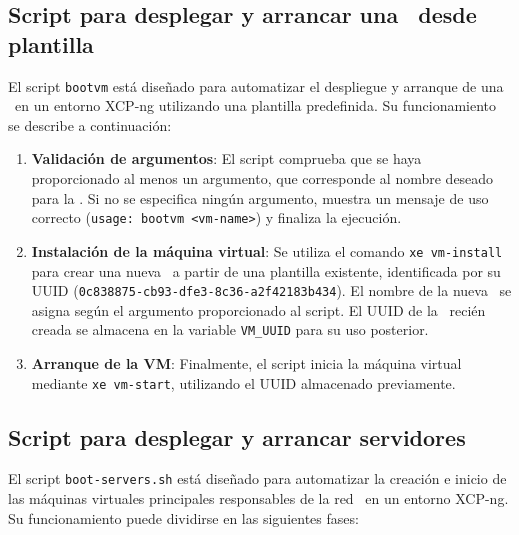 

\subsection{Script para desplegar y arrancar una \VM\ desde plantilla}
\noindent
El script \texttt{bootvm} está diseñado para automatizar el despliegue y arranque de una \VM\ en un entorno XCP-ng utilizando una plantilla predefinida. Su funcionamiento se describe a continuación:

\begin{enumerate}
    \item \textbf{Validación de argumentos}:  
    El script comprueba que se haya proporcionado al menos un argumento, que corresponde al nombre deseado para la \VM. Si no se especifica ningún argumento, muestra un mensaje de uso correcto (\texttt{usage: bootvm <vm-name>}) y finaliza la ejecución.

    \item \textbf{Instalación de la máquina virtual}:  
    Se utiliza el comando \texttt{xe vm-install} para crear una nueva \VM\ a partir de una plantilla existente, identificada por su UUID (\texttt{0c838875-cb93-dfe3-8c36-a2f42183b434}). El nombre de la nueva \VM\ se asigna según el argumento proporcionado al script. El UUID de la \VM\ recién creada se almacena en la variable \texttt{VM\_UUID} para su uso posterior.

    \item \textbf{Arranque de la VM}:  
    Finalmente, el script inicia la máquina virtual mediante \texttt{xe vm-start}, utilizando el UUID almacenado previamente.

\end{enumerate}



\subsection{Script para desplegar y arrancar servidores \NAT}
\noindent
El script \texttt{boot-servers.sh} está diseñado para automatizar la creación e inicio de las máquinas virtuales principales responsables de la red \NAT\ en un entorno XCP-ng. Su funcionamiento puede dividirse en las siguientes fases:

